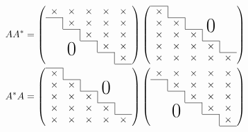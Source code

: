 \documentclass[11pt]{article} %
\begin{document}
\begin{equation}
\begin{split}
A A^* &=
  \left(
    \begin{array}{ccccc}
    \x    & \x       & \x    & \x    & \x \\ \cline{1-1}
    \bordl & \x       & \x    & \x    & \x \\ \cline{2-2}
          & \bordl    & \x    & \x    & \x \\ \cline{3-3}
          & \bigzero & \bordl & \x    & \x \\ \cline{4-4}
          &          &       & \bordl & \x \\ \cline{5-5}
  \end{array}\right)
  \left(
    \begin{array}{ccccc}\cline{1-1}
    \x    &   \bordr    &   &     &  \\ \cline{2-2}
    \x & \x       &  \bordr   & \bigzero    &  \\ \cline{3-3}
     \x     & \x    & \x    &\bordr   &  \\ \cline{4-4}
      \x    & \x & \x & \x    & \bordr \\ \cline{5-5}
       \x   &   \x       &   \x    & \x & \x \\ 
  \end{array}\right) \\
A^*A &=    \left(
    \begin{array}{ccccc}\cline{1-1}
    \x    &   \bordr    &   &     &  \\ \cline{2-2}
    \x & \x       &  \bordr   & \bigzero    &  \\ \cline{3-3}
     \x     & \x    & \x    &\bordr   &  \\ \cline{4-4}
      \x    & \x & \x & \x    & \bordr \\ \cline{5-5}
       \x   &   \x       &   \x    & \x & \x \\ 
  \end{array}\right)
  \left(
    \begin{array}{ccccc}
    \x    & \x       & \x    & \x    & \x \\ \cline{1-1}
    \bordl & \x       & \x    & \x    & \x \\ \cline{2-2}
          & \bordl    & \x    & \x    & \x \\ \cline{3-3}
          & \bigzero & \bordl & \x    & \x \\ \cline{4-4}
          &          &       & \bordl & \x \\ \cline{5-5}
  \end{array}\right)
\end{split}
\end{equation}
\end{document}
